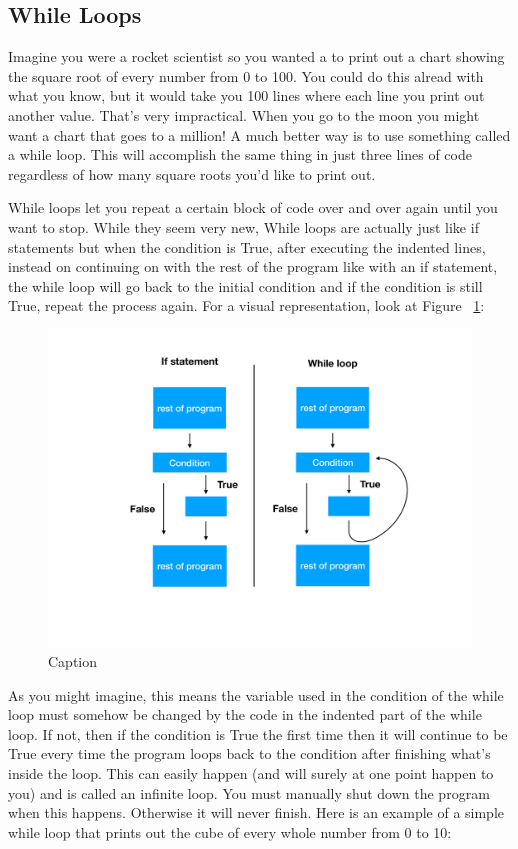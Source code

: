 \documentclass[]{article}
\begin{document}
\subsection { While Loops }

Imagine you were a rocket scientist so you wanted a to print out a chart showing the square root of every number from 0 to 100.  You could do this alread with what you know, but it would take you 100 lines where each line you print out another value. That's very impractical.  When you go to the moon you might want a chart that goes to a million! A much better way is to use something called a while loop.  This will accomplish the same thing in just three lines of code regardless of how many square roots you'd like to print out. 

While loops let you repeat a certain block of code over and over again until you want to stop. While they seem very new, While loops are actually just like if statements but when the condition is True, after executing the indented lines, instead on continuing on with the rest of the program like with an if statement, the while loop will go back to the initial condition and if the condition is still True, repeat the process again.  For a visual representation, look at Figure ~\ref{fig:ifWhileDiagram}: 
\begin{figure}[!htb]
    \centering
    \includegraphics[width=\textwidth]{if-statement-while-loop-diagram.pdf}
    \caption{Caption}
    \label{fig:ifWhileDiagram}
\end{figure}

As you might imagine, this means the variable used in the condition of the while loop must somehow be changed by the code in the indented part of the while loop.  If not, then if the condition is True the first time then it will continue to be True every time the program loops back to the condition after finishing what's inside the loop. This can easily happen (and will surely at one point happen to you) and is called an infinite loop.  You must manually shut down the program when this happens.  Otherwise it will never finish.  Here is an example of a simple while loop that prints out the cube of every whole number from 0 to 10:
\end{document}
